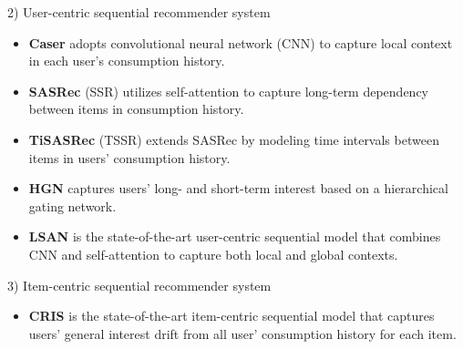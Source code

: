 \documentclass[sigconf]{acmart}
\begin{document}
2) User-centric sequential recommender system
\begin{itemize}
    \item[] \textbf{Caser} \cite{tang2018personalized} adopts convolutional neural network (CNN) to capture local context in each user's consumption history.
    \item[] \textbf{SASRec} (SSR) \cite{kang2018self} utilizes self-attention to capture long-term dependency between items in consumption history. 
    \item[] \textbf{TiSASRec} (TSSR) \cite{li2020time} extends SASRec by modeling time intervals between items in users' consumption history.
    \item[] \textbf{HGN} \cite{ma2019hierarchical} captures users' long- and short-term interest based on a hierarchical gating network.
    \item[] \textbf{LSAN} \cite{li2021lightweight} is the state-of-the-art user-centric sequential model that combines CNN and self-attention to capture both local and global contexts.
\end{itemize}

3) Item-centric sequential recommender system
\begin{itemize}
    \item[] \textbf{CRIS} \cite{hyun2020interest} is the state-of-the-art item-centric sequential model that captures users' general interest drift from all user' consumption history for each item.
\end{itemize}
\end{document}
